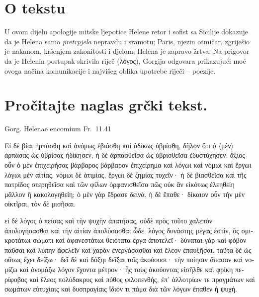 


\section*{O tekstu}

U ovom dijelu apologije mitske ljepotice Helene retor i sofist sa Sicilije dokazuje da je Helena samo \textit{pretrpjela} nepravdu i sramotu; Paris, njezin otmičar, zgriješio je nakanom, kršenjem zakonitosti i djelom; Helena je zapravo žrtva. Na prigovor da je Helenin postupak skrivila riječ (λόγος), Gorgija odgovara prikazujući moć ovoga načina komunikacije i najvišeg oblika upotrebe riječi – poezije.


\section*{Pročitajte naglas grčki tekst.}
Gorg. Helenae encomium Fr.\ 11.41

\medskip

{\large
\begin{greek}
\noindent Εἰ δὲ βίαι ἡρπάσθη καὶ ἀνόμως ἐβιάσθη καὶ ἀδίκως ὑβρίσθη, δῆλον ὅτι ὁ $\langle$μὲν$\rangle$ ἁρπάσας ὡς ὑβρίσας ἠδίκησεν, ἡ δὲ ἁρπασθεῖσα ὡς ὑβρισθεῖσα ἐδυστύχησεν. ἄξιος οὖν ὁ μὲν ἐπιχειρήσας βάρβαρος βάρβαρον ἐπιχείρημα καὶ λόγωι καὶ νόμωι καὶ ἔργωι λόγωι μὲν αἰτίας, νόμωι δὲ ἀτιμίας, ἔργωι δὲ ζημίας τυχεῖν· ἡ δὲ βιασθεῖσα καὶ τῆς πατρίδος στερηθεῖσα καὶ τῶν φίλων ὀρφανισθεῖσα πῶς οὐκ ἂν εἰκότως ἐλεηθείη μᾶλλον ἢ κακολογηθείη; ὁ μὲν γὰρ ἔδρασε δεινά, ἡ δὲ ἔπαθε· δίκαιον οὖν τὴν μὲν οἰκτῖραι, τὸν δὲ μισῆσαι. 

εἰ δὲ λόγος ὁ πείσας καὶ τὴν ψυχὴν ἀπατήσας, οὐδὲ πρὸς τοῦτο χαλεπὸν ἀπολογήσασθαι καὶ τὴν αἰτίαν ἀπολύσασθαι ὧδε. λόγος δυνάστης μέγας ἐστίν, ὃς σμικροτάτωι σώματι καὶ ἀφανεστάτωι θειότατα ἔργα ἀποτελεῖ· δύναται γὰρ καὶ φόβον παῦσαι καὶ λύπην ἀφελεῖν καὶ χαρὰν ἐνεργάσασθαι καὶ ἔλεον ἐπαυξῆσαι. ταῦτα δὲ ὡς οὕτως ἔχει δείξω· δεῖ δὲ καὶ δόξηι δεῖξαι τοῖς ἀκούουσι· τὴν ποίησιν ἅπασαν καὶ νομίζω καὶ ὀνομάζω λόγον ἔχοντα μέτρον· ἧς τοὺς ἀκούοντας εἰσῆλθε καὶ φρίκη περίφοβος καὶ ἔλεος πολύδακρυς καὶ πόθος φιλοπενθής, ἐπ' ἀλλοτρίων τε πραγμάτων καὶ σωμάτων εὐτυχίαις καὶ δυσπραγίαις ἴδιόν τι πάμα διὰ τῶν λόγων ἔπαθεν ἡ ψυχή.

\end{greek}

}


